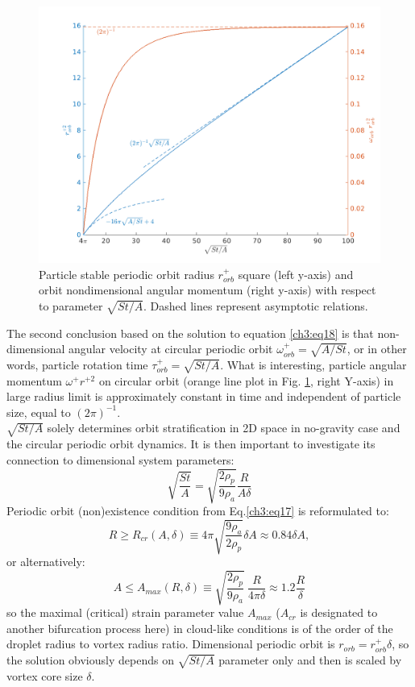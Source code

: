 \documentclass[../main.tex]{subfiles}
\begin{document}
\begin{figure}
\centering
\noindent \includegraphics[width=30pc]{gfx/r0_2_sqrt_St_A_omega_r0_2.png}
\caption{Particle stable periodic orbit radius $r^+_{orb}$ square (left y-axis) and orbit nondimensional angular momentum (right y-axis) with respect to parameter $\sqrt{St/A}$. Dashed lines represent asymptotic relations.}
\label{fig:ch3_3}
\end{figure}

The second conclusion based on the solution to equation \ref{ch3:eq18} is that non-dimensional angular velocity at circular periodic orbit $\omega^{+}_{orb}=\sqrt{A/St}$, or in other words, particle rotation time $\tau^+_{orb}=\sqrt{St/A}$. What is interesting, particle angular momentum $\omega^{+} r^{+ 2}$ on circular orbit (orange line plot in Fig. \ref{fig:ch3_3}, right Y-axis) in large radius limit is approximately constant in time and independent of particle size, equal to $(2 \pi)^{-1}$. \\
$\sqrt{St/A}$ solely determines orbit stratification in 2D space in no-gravity case and the circular periodic orbit dynamics. It is then important to investigate its connection to dimensional system parameters:
\begin{equation}
\sqrt{\frac{St}{A}}=\sqrt{\frac{2\rho_p}{9 \rho_a}} \frac{R}{A \delta} 
\label{ch3:eq19_0}
\end{equation}
Periodic orbit (non)existence condition from Eq.\ref{ch3:eq17} is reformulated to:
\begin{equation}
R \geq R_{cr}(A,\delta) \equiv 4 \pi \sqrt{\frac{9\rho_a}{2\rho_p}}\delta A \approx 0.84 \delta A,
\label{ch3:eq19}
\end{equation}
or alternatively:
\begin{equation}
A \leq A_{max}(R,\delta)\equiv \sqrt{\frac{2\rho_p}{9\rho_a}}\  \frac{R}{4 \pi \delta}\approx 1.2 \frac{R}{\delta}
\label{ch3:eq19a}
\end{equation}
so the maximal (critical) strain parameter value $A_{max}$ ($A_{cr}$ is designated to another bifurcation process here) in cloud-like conditions is of the order of the droplet radius to vortex radius ratio.
Dimensional periodic orbit is $r_{orb}=r^+_{orb} \delta$, so the solution obviously depends on $\sqrt{St/A}$ parameter only and then is scaled by vortex core size $\delta$.
\end{document}
